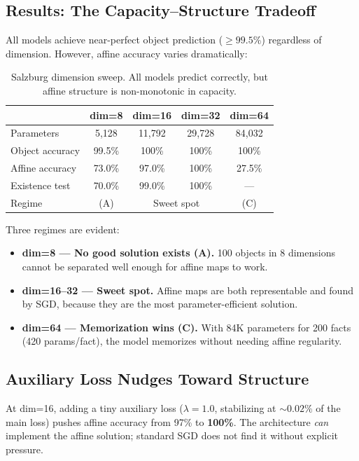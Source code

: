 \documentclass[11pt]{article}
\begin{document}
\subsection{Results: The Capacity--Structure Tradeoff}

All models achieve near-perfect object prediction ($\geq 99.5\%$) regardless of
dimension.  However, affine accuracy varies dramatically:

\begin{table}[h]
\centering
\caption{Salzburg dimension sweep. All models predict correctly, but affine structure
is non-monotonic in capacity.}
\label{tab:salzburg}
\begin{tabular}{lcccc}
\toprule
& dim=8 & dim=16 & dim=32 & dim=64 \\
\midrule
Parameters & 5,128 & 11,792 & 29,728 & 84,032 \\
Object accuracy & 99.5\% & 100\% & 100\% & 100\% \\
Affine accuracy & 73.0\% & 97.0\% & 100\% & 27.5\% \\
Existence test & 70.0\% & 99.0\% & 100\% & --- \\
\midrule
Regime & (A) & \multicolumn{2}{c}{Sweet spot} & (C) \\
\bottomrule
\end{tabular}
\end{table}

Three regimes are evident:
\begin{itemize}
\item \textbf{dim=8 --- No good solution exists (A).} 100 objects in 8 dimensions
  cannot be separated well enough for affine maps to work.
\item \textbf{dim=16--32 --- Sweet spot.} Affine maps are both representable and found
  by SGD, because they are the most parameter-efficient solution.
\item \textbf{dim=64 --- Memorization wins (C).} With 84K parameters for 200 facts
  (420 params/fact), the model memorizes without needing affine regularity.
\end{itemize}

\subsection{Auxiliary Loss Nudges Toward Structure}

At dim=16, adding a tiny auxiliary loss ($\lambda = 1.0$, stabilizing at ${\sim}0.02\%$
of the main loss) pushes affine accuracy from 97\% to \textbf{100\%}.  The architecture
\emph{can} implement the affine solution; standard SGD does not find it without explicit
pressure.
\end{document}
